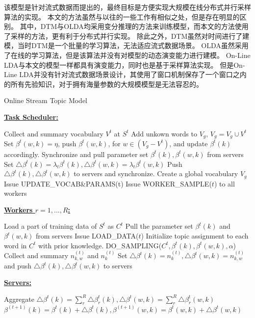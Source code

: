 该模型是针对流式数据而提出的，最终目标是方便实现大规模在线分布式并行采样算法的实现。
本文的方法虽然与以往的一些工作有相似之处，但是存在明显的区别。
其中，DTM与OLDA均采用变分推理的方法来训练模型，而本文的方法使用了采样的方法，更有利于分布式并行实现。
除此之外，DTM虽然对时间进行了建模，当时DTM是一个批量的学习算法，无法适应流式数据场景。
OLDA虽然采用了在线的学习算法，但是该算法并没有对模型的动态演变能力进行建模。
On-Line LDA与本文的模型一样都具有演变能力，同时也是基于采样算法实现。
但是On-Line LDA并没有针对流式数据场景设计，其使用了窗口机制保存了一个窗口之内的所有先验知识，对于拥有海量参数的大规模模型是无法容忍的。

\begin{algorithm}[]
\caption{Online Stream Topic Model}
\label{alg:onlineStreamLDA}
\textbf{\underline{Task Scheduler:}}
\begin{algorithmic}[1]
\State Collect and summary vocabulary $V^t$ at $S^t$
\State Add unkown words to $V_g$, $V_g = V_g \cup V^t$
\State Set $\beta^t(w, k) = \eta$, push $\beta^t(w, k)$, for $w \in (V_g - V^t)$, and update $\beta^t(k)$ accordingly.
\State Synchronize and pull parameter set $\beta^t(k), \beta^t(w, k)$ from servers
\State Set $\bigtriangleup \beta^t(k) = \lambda_t \beta^t(k), \bigtriangleup \beta^t(w, k) = \lambda_t \beta^t(w, k)$
\State Push $\bigtriangleup \beta^t(k), \bigtriangleup \beta^t(w, k)$  to servers and synchronize.
\EndFunction
\State Create a global vocabulary $V_g$
\State Issue UPDATE\_VOCAB\&PARAMS(t)
\State Issue WORKER\_SAMPLE($t$) to all workers
\EndFor
\end{algorithmic}
\textbf{\underline{Workers $r = 1, ..., R$:}}
\begin{algorithmic}[1]
\State Load a part of training data of $S^t$ as $C^t$
\State Pull the parameter set $\beta^t(k)$ and $\beta^t(w, k)$ from servers
\EndFunction
{}
\State Issue LOAD\_DATA($t$)
\State Initialize topic assignment to each word in $C^t$ with prior knowledge.
\State DO\_SAMPLING($C^t, \beta^t(k), \beta^t(w, k), \alpha$)
\EndFor
\State Collect and summary $n_{k,w}^{(t)}$ and $n_{k}^{(t)}$
\State Set $\bigtriangleup \beta^t(k) = n_{k}^{(t)}, \bigtriangleup \beta^t(w, k) = n_{k,w}^{(t)}$ and push $\bigtriangleup \beta^t(k), \bigtriangleup \beta^t(w, k)$ to servers
\EndFunction
\end{algorithmic}  
\textbf{\underline{Servers:}}
\begin{algorithmic}[1]
\State Aggregate $\bigtriangleup \beta^t(k) = \sum_r^R{\bigtriangleup \beta^t_r(k)}, \bigtriangleup \beta^t(w, k) = \sum_r^R{\bigtriangleup \beta^t_r(w, k)}$
\State $\beta^{(t+1)}(k) =\beta^t(k) +  \bigtriangleup \beta^t(k), \beta^{(t+1)}(w, k) = \beta^t(w, k) + \bigtriangleup \beta^t(w, k)$
\EndFunction
\end{algorithmic}
\end{algorithm}  

